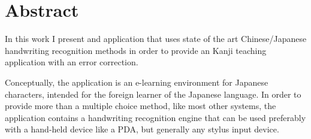 
\section{Abstract}
In this work I present and application that uses state of the art 
Chinese/Japanese handwriting recognition methods in order to provide 
an Kanji teaching application with an error correction.

Conceptually, the application is an e-learning environment for Japanese 
characters, intended for the foreign learner of the Japanese language. 
In order to provide more than a  multiple choice method, like most other 
systems, the application contains a handwriting recognition engine that can
be used preferably with a hand-held device like a PDA, but generally any 
stylus input device.

